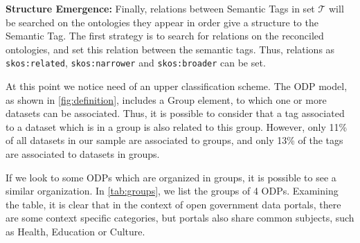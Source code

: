 \noindent \textbf{Structure Emergence:} Finally, relations between Semantic Tags in set $\mathcal{T}$ will be searched on the ontologies they appear in order give a structure to the Semantic Tag.
The first strategy is to search for relations on the reconciled ontologies, and set this relation between the semantic tags.
Thus, relations as \texttt{skos:related}, \texttt{skos:narrower} and \texttt{skos:broader} can be set.

At this point we notice need of an upper classification scheme.
The ODP model, as shown in \autoref{fig:definition}, includes a Group element, to which one or more datasets can be associated.
Thus, it is possible to consider that a tag associated to a dataset which is in a group is also related to this group.
However, only 11\% of all datasets in our sample are associated to groups, and only 13\% of the tags are associated to datasets in groups.

If we look to some ODPs which are organized in groups, it is possible to see a similar organization.
In \autoref{tab:groups}, we list the groups of 4 ODPs. 
Examining the table, it is clear that in the context of open government data portals, there are some context specific categories, but portals also share common subjects, such as Health, Education or Culture.

